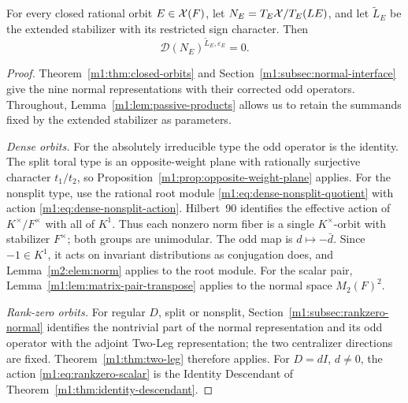 \begin{proposition}\label{m1:prop:all-descendants}
\label{m1:thm:dense-descendants}\label{m1:thm:rank00-descendants}
\label{m1:thm:decomposable-descendant}\label{m1:thm:stable-system-descendant}
For every closed rational orbit $E\in\mathcal X(F)$, let
$N_E=T_E\mathcal X/T_E(LE)$, and let $\widetilde L_E$ be the extended
stabilizer with its restricted sign character. Then
\[
 \mathcal D(N_E)^{\widetilde L_E,\varepsilon_E}=0.
\]
\end{proposition}
\begin{proof}
Theorem~\ref{m1:thm:closed-orbits} and
Section~\ref{m1:subsec:normal-interface} give the nine normal
representations with their corrected odd operators. Throughout,
Lemma~\ref{m1:lem:passive-products} allows us to retain the summands
fixed by the extended stabilizer as parameters.

\emph{Dense orbits.}
For the absolutely irreducible type the odd operator is the identity.
The split toral type is an opposite-weight plane with rationally
surjective character $t_1/t_2$, so
Proposition~\ref{m1:prop:opposite-weight-plane} applies.
For the nonsplit type, use the rational root module
\eqref{m1:eq:dense-nonsplit-quotient} with action
\eqref{m1:eq:dense-nonsplit-action}. Hilbert~90 identifies the effective
action of $K^\times/F^\times$ with all of $K^1$. Thus each nonzero
norm fiber is a single $K^\times$-orbit with stabilizer $F^\times$;
both groups are unimodular. The odd map is $d\mapsto-\bar d$. Since $-1\in K^1$,
it acts on invariant distributions as conjugation does, and
Lemma~\ref{m2:elem:norm} applies to the root module.
For the scalar pair, Lemma~\ref{m1:lem:matrix-pair-transpose} applies
to the normal space $M_2(F)^2$.

\emph{Rank-zero orbits.}
For regular $D$, split or nonsplit,
Section~\ref{m1:subsec:rankzero-normal} identifies the nontrivial part
of the normal representation and its odd operator with the adjoint
Two-Leg representation; the two
centralizer directions are fixed. Theorem~\ref{m1:thm:two-leg}
therefore applies. For $D=dI$, $d\ne0$, the action
\eqref{m1:eq:rankzero-scalar} is the
Identity Descendant of Theorem~\ref{m1:thm:identity-descendant}.


\end{proof}

